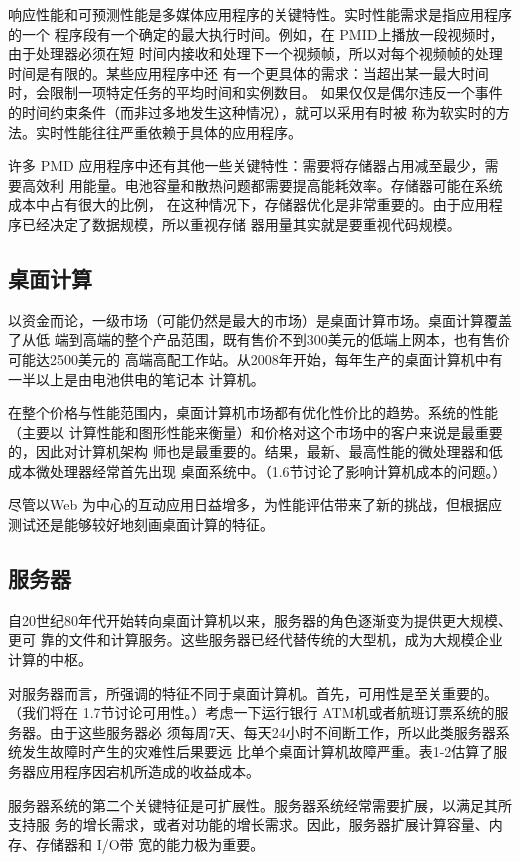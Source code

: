 响应性能和可预测性能是多媒体应用程序的关键特性。实时性能需求是指应用程序的一个
程序段有一个确定的最大执行时间。例如，在 PMID上播放一段视频时，由于处理器必须在短
时间内接收和处理下一个视频帧，所以对每个视频帧的处理时间是有限的。某些应用程序中还
有一个更具体的需求：当超出某一最大时间时，会限制一项特定任务的平均时间和实例数目。
如果仅仅是偶尔违反一个事件的时间约束条件（而非过多地发生这种情况），就可以采用有时被
称为软实时的方法。实时性能往往严重依赖于具体的应用程序。

许多 PMD 应用程序中还有其他一些关键特性：需要将存储器占用减至最少，需要高效利
用能量。电池容量和散热问题都需要提高能耗效率。存储器可能在系统成本中占有很大的比例，
在这种情况下，存储器优化是非常重要的。由于应用程序已经决定了数据规模，所以重视存储
器用量其实就是要重视代码规模。

\subsection{桌面计算}
以资金而论，一级市场（可能仍然是最大的市场）是桌面计算市场。桌面计算覆盖了从低
端到高端的整个产品范围，既有售价不到300美元的低端上网本，也有售价可能达2500美元的
高端高配工作站。从2008年开始，每年生产的桌面计算机中有一半以上是由电池供电的笔记本
计算机。

在整个价格与性能范围内，桌面计算机市场都有优化性价比的趋势。系统的性能（主要以
计算性能和图形性能来衡量）和价格对这个市场中的客户来说是最重要的，因此对计算机架构
师也是最重要的。结果，最新、最高性能的微处理器和低成本微处理器经常首先出现
桌面系统中。（1.6节讨论了影响计算机成本的问题。）

尽管以Web 为中心的互动应用日益增多，为性能评估带来了新的挑战，但根据应
测试还是能够较好地刻画桌面计算的特征。

\subsection{服务器}
自20世纪80年代开始转向桌面计算机以来，服务器的角色逐渐变为提供更大规模、更可
靠的文件和计算服务。这些服务器已经代替传统的大型机，成为大规模企业计算的中枢。

对服务器而言，所强调的特征不同于桌面计算机。首先，可用性是至关重要的。（我们将在
1.7节讨论可用性。）考虑一下运行银行 ATM机或者航班订票系统的服务器。由于这些服务器必
须每周7天、每天24小时不间断工作，所以此类服务器系统发生故障时产生的灾难性后果要远
比单个桌面计算机故障严重。表1-2估算了服务器应用程序因宕机所造成的收益成本。

服务器系统的第二个关键特征是可扩展性。服务器系统经常需要扩展，以满足其所支持服
务的增长需求，或者对功能的增长需求。因此，服务器扩展计算容量、内存、存储器和 I/O带
宽的能力极为重要。

